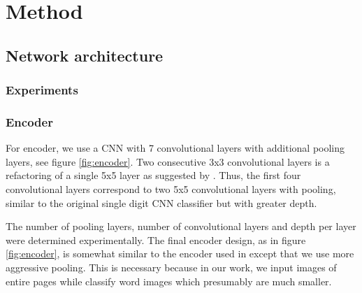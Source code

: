 \section{Method}

\subsection{Network architecture}



\subsubsection{Experiments}

\subsubsection{Encoder}



For encoder, we use a CNN with 7 convolutional layers with additional pooling layers, see figure \ref{fig:encoder}.
Two consecutive 3x3 convolutional layers is a refactoring of a single 5x5 layer as suggested by \cite{InceptionV3}. Thus, the first four convolutional layers correspond to two 5x5 convolutional layers with pooling, similar to the original single digit CNN classifier \cite{lecun_1989} but with greater depth.

The number of pooling layers, number of convolutional layers and depth per layer were determined experimentally. The final encoder design, as in figure \ref{fig:encoder}, is somewhat similar to the encoder used in \cite{FornesCnnCategorization} except that we use more aggressive pooling. This is necessary because in our work, we input images of entire pages while \cite{FornesCnnCategorization} classify word images which presumably are much smaller.






